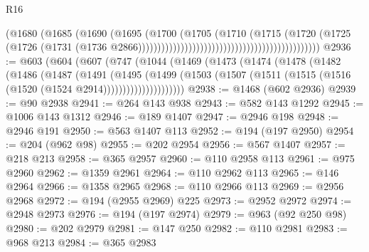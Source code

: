 \begin{lexlean}{R16}
\begin{coremodule}
                                                                        (@1680
                                                                          (@1685
                                                                            (@1690
                                                                              (@1695
                                                                                (@1700
                                                                                  (@1705
                                                                                    (@1710
                                                                                      (@1715
                                                                                        (@1720
                                                                                          (@1725
                                                                                            (@1726
                                                                                              (@1731
                                                                                                (@1736
                                                                                                  @2866)))))))))))))))))))))))))))))))))))))))))))))))
@2936 := @603
    (@604
      (@607
        (@747
          (@1044
            (@1469
              (@1473
                (@1474
                  (@1478
                    (@1482
                      (@1486
                        (@1487
                          (@1491
                            (@1495
                              (@1499
                                (@1503
                                  (@1507
                                    (@1511 (@1515 (@1516 (@1520 (@1524 @2914)))))))))))))))))))))
@2938 := @1468 (@602 @2936)
@2939 := @90 @2938
@2941 := @264 @143 @938
@2943 := @582 @143 @1292
@2945 := @1006 @143 @1312
@2946 := @189 @1407
@2947 := @2946 @198
@2948 := @2946 @191
@2950 := @563 @1407 @113
@2952 := @194 (@197 @2950)
@2954 := @204 (@962 @98)
@2955 := @202 @2954
@2956 := @567 @1407
@2957 := @218 @213
@2958 := @365 @2957
@2960 := @110 @2958 @113
@2961 := @975 @2960
@2962 := @1359 @2961
@2964 := @110 @2962 @113
@2965 := @146 @2964
@2966 := @1358 @2965
@2968 := @110 @2966 @113
@2969 := @2956 @2968
@2972 := @194 (@2955 @2969) @225
@2973 := @2952 @2972
@2974 := @2948 @2973
@2976 := @194 (@197 @2974)
@2979 := @963 (@92 @250 @98)
@2980 := @202 @2979
@2981 := @147 @250
@2982 := @110 @2981
@2983 := @968 @213
@2984 := @365 @2983

\end{coremodule}
\end{lexlean}
